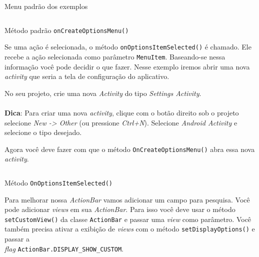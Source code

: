 \documentclass[a4paper,12pt,brazil,oneside]{book}
\begin{document}
		\begin{listing}[H]
		\inputminted[linenos=true,fontsize=\small,frame=lines, framesep=2mm, tabsize=2,numbersep=5pt]{xml}{src/design/actionbar-menupadrao.xml}
		\caption{Menu padrão dos exemplos}
		\end{listing}

		\begin{listing}[H]
		\inputminted[linenos=true,fontsize=\small,frame=lines, framesep=2mm, tabsize=2,numbersep=5pt]{java}{src/design/oncreateoptionsmenu-padrao.java}
		\caption{Método padrão \texttt{onCreateOptionsMenu()}}
		\label{code:actionbarNew}
		\end{listing}
		
		Se uma ação é selecionada, o método \texttt{onOptionsItemSelected()} é chamado. Ele recebe a ação selecionada como parâmetro \texttt{MenuItem}. Baseando-se nessa informação você pode decidir o que fazer. Nesse exemplo iremos abrir uma nova \emph{activity} que seria a tela de configuração do aplicativo.
		
		No seu projeto, crie uma nova \emph{Activity} do tipo \emph{Settings Activity}. 
		
		\begin{framed}
\paragraph{}\textbf{Dica}: Para criar uma nova \emph{activity}, clique com o botão direito sob o projeto selecione \emph{New -> Other} (ou pressione \emph{Ctrl+N}). Selecione \emph{Android Activity} e selecione o tipo desejado.
\textit{}
\end{framed}

		
		Agora você deve fazer com que o método \texttt{OnCreateOptionsMenu()} abra essa nova \emph{activity}.
		
		\begin{listing}[H]
		\inputminted[linenos=true,fontsize=\small,frame=lines, framesep=2mm, tabsize=2,numbersep=5pt]{java}{src/design/onoptionsitemselected.java}
		\caption{Método \texttt{OnOptionsItemSelected()}}
		\end{listing}

		Para melhorar nossa \emph{ActionBar} vamos adicionar um campo para pesquisa. Você pode adicionar \emph{views} em sua \emph{ActionBar}. Para isso você deve usar o método \texttt{setCustomView()}  da classe \texttt{ActionBar} e passar uma \emph{view} como parâmetro. Você também precisa ativar a exibição de \emph{views} com o método \texttt{setDisplayOptions()} e passar a \\ \emph{flag} \texttt{ActionBar.DISPLAY\_SHOW\_CUSTOM}.
		
\end{document}
